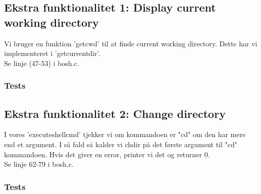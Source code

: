 \subsection{Ekstra funktionalitet 1: Display current working directory}
Vi bruger en funktion 'getcwd' til at finde current working directory. Dette har vi implementeret i 'getcurrentdir'.
\\Se linje (47-53) i bosh.c.
\subsubsection{Tests}

\subsection{Ekstra funktionalitet 2: Change directory}
I vores 'executeshellcmd' tjekker vi om kommandoen er "cd" om den har mere end et argument. I så fald så kalder vi chdir på det første argument til "cd" kommandoen. Hvis det giver en error, printer vi det og returner 0.
\\Se linje 62-79 i bosh.c.
\subsubsection{Tests}
